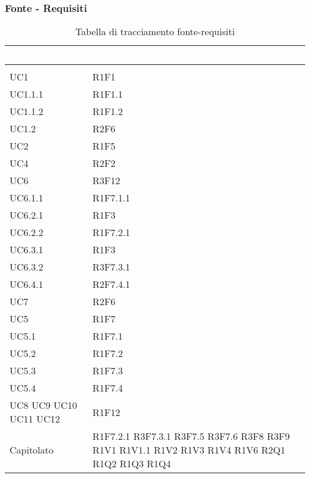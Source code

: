 \subsubsection{Fonte - Requisiti}
\renewcommand{\arraystretch}{1.5}
\begin{center}
\begin{longtable}{C{6cm} C{6cm}}
		\textcolor{white}{\textbf{Fonte}} & 
		\textcolor{white}{\textbf{Requisiti}}\\
		\endfirsthead
	    \\
	    \endfoot
	    \caption{Tabella di tracciamento fonte-requisiti}
	    \endlastfoot

UC1 &  	R1F1\\
UC1.1.1 & R1F1.1\\
UC1.1.2 & R1F1.2\\
UC1.2 & R2F6\\
UC2 & R1F5\\
UC4 & R2F2\\
UC6 & R3F12\\
UC6.1.1 & R1F7.1.1\\
UC6.2.1 & R1F3\\
UC6.2.2 & R1F7.2.1\\
UC6.3.1 & R1F3\\
UC6.3.2 & R3F7.3.1\\
UC6.4.1 & R2F7.4.1\\
UC7 & R2F6\\
UC5 & R1F7\\
UC5.1 & R1F7.1\\
UC5.2 & R1F7.2\\
UC5.3 & R1F7.3\\
UC5.4 & R1F7.4\\
			  
UC8 \newline UC9 \newline UC10 \newline UC11 \newline UC12 & R1F12 \\

Capitolato &  	R1F7.2.1 \newline
				R3F7.3.1 \newline
				R3F7.5 \newline
				R3F7.6 \newline
				R3F8 \newline
				R3F9 \newline
				R1V1 \newline
				R1V1.1 \newline
				R1V2 \newline
				R1V3 \newline
				R1V4 \newline
				R1V6 \newline
				R2Q1 \newline
				R1Q2 \newline
				R1Q3 \newline
				R1Q4 \\


\end{longtable}
\end{center}
